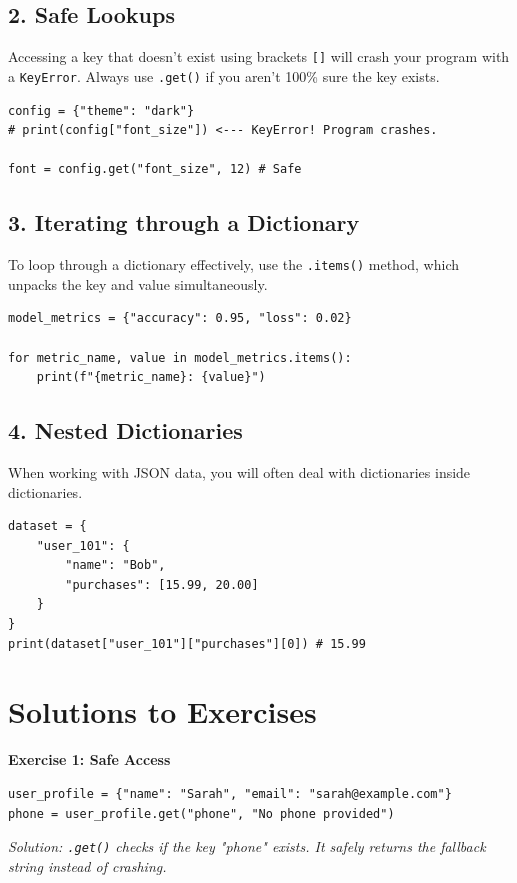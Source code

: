\subsection{2. Safe Lookups}
Accessing a key that doesn't exist using brackets \texttt{[]} will crash your program with a \texttt{KeyError}. Always use \texttt{.get()} if you aren't 100\% sure the key exists.
\begin{lstlisting}
config = {"theme": "dark"}
# print(config["font_size"]) <--- KeyError! Program crashes.

font = config.get("font_size", 12) # Safe
\end{lstlisting}

\subsection{3. Iterating through a Dictionary}
To loop through a dictionary effectively, use the \texttt{.items()} method, which unpacks the key and value simultaneously.
\begin{lstlisting}
model_metrics = {"accuracy": 0.95, "loss": 0.02}

for metric_name, value in model_metrics.items():
    print(f"{metric_name}: {value}")
\end{lstlisting}

\subsection{4. Nested Dictionaries}
When working with JSON data, you will often deal with dictionaries inside dictionaries.
\begin{lstlisting}
dataset = {
    "user_101": {
        "name": "Bob",
        "purchases": [15.99, 20.00]
    }
}
print(dataset["user_101"]["purchases"][0]) # 15.99
\end{lstlisting}


\section{Solutions to Exercises}

\textbf{Exercise 1: Safe Access}
\begin{lstlisting}
user_profile = {"name": "Sarah", "email": "sarah@example.com"}
phone = user_profile.get("phone", "No phone provided")
\end{lstlisting}
\textit{Solution: \texttt{.get()} checks if the key "phone" exists. It safely returns the fallback string instead of crashing.}

